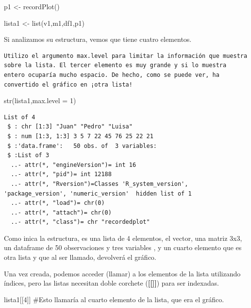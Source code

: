 \documentclass[
  letterpaper,
  DIV=11,
  numbers=noendperiod]{scrreprt}
\newenvironment{Shaded}{\begin{snugshade}}{\end{snugshade}}
\newcommand{\AttributeTok}[1]{\textcolor[rgb]{0.40,0.45,0.13}{#1}}
\newcommand{\CommentTok}[1]{\textcolor[rgb]{0.37,0.37,0.37}{#1}}
\newcommand{\DecValTok}[1]{\textcolor[rgb]{0.68,0.00,0.00}{#1}}
\newcommand{\FunctionTok}[1]{\textcolor[rgb]{0.28,0.35,0.67}{#1}}
\newcommand{\NormalTok}[1]{\textcolor[rgb]{0.00,0.23,0.31}{#1}}
\newcommand{\OtherTok}[1]{\textcolor[rgb]{0.00,0.23,0.31}{#1}}
\begin{document}
\begin{Shaded}
\begin{Highlighting}[]
\NormalTok{p1 }\OtherTok{\textless{}{-}} \FunctionTok{recordPlot}\NormalTok{()}

\NormalTok{lista1 }\OtherTok{\textless{}{-}} \FunctionTok{list}\NormalTok{(v1,m1,df1,p1)}
\end{Highlighting}
\end{Shaded}

Si analizamos su estructura, vemos que tiene cuatro elementos.

\begin{verbatim}
Utilizo el argumento max.level para limitar la información que muestra sobre la lista. El tercer elemento es muy grande y si lo muestra entero ocuparía mucho espacio. De hecho, como se puede ver, ha convertido el gráfico en ¡otra lista!
\end{verbatim}

\begin{Shaded}
\begin{Highlighting}[]
\FunctionTok{str}\NormalTok{(lista1,}\AttributeTok{max.level =} \DecValTok{1}\NormalTok{) }
\end{Highlighting}
\end{Shaded}

\begin{verbatim}
List of 4
 $ : chr [1:3] "Juan" "Pedro" "Luisa"
 $ : num [1:3, 1:3] 3 5 7 22 45 76 25 22 21
 $ :'data.frame':   50 obs. of  3 variables:
 $ :List of 3
  ..- attr(*, "engineVersion")= int 16
  ..- attr(*, "pid")= int 12188
  ..- attr(*, "Rversion")=Classes 'R_system_version', 'package_version', 'numeric_version'  hidden list of 1
  ..- attr(*, "load")= chr(0) 
  ..- attr(*, "attach")= chr(0) 
  ..- attr(*, "class")= chr "recordedplot"
\end{verbatim}

Como inica la estructura, es una lista de 4 elementos, el vector, una
matriz 3x3, un dataframe de 50 observaciones y tres variables , y un
cuarto elemento que es otra lista y que al ser llamado, devolverá el
gráfico.

Una vez creada, podemos acceder (llamar) a los elementos de la lista
utilizando índices, pero las listas necesitan doble corchete
(\textbf{{[}{[}{]}{]}}) para ser indexadas.

\begin{Shaded}
\begin{Highlighting}[]
\NormalTok{lista1[[}\DecValTok{4}\NormalTok{]] }\CommentTok{\#Esto llamaría al cuarto elemento de la lista, que era el gráfico.}
\end{Highlighting}
\end{Shaded}
\end{document}
